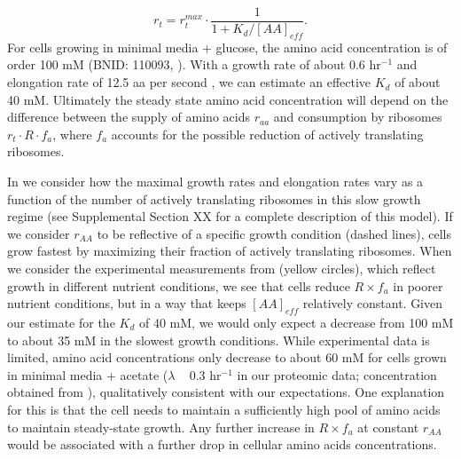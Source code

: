 \begin{equation}
r_t = r_t^{max} \cdot \frac{1}{1 + K_d / [AA]_{eff}}.
\label{eq:rate_Kd}
\end{equation}
For cells growing in minimal media + glucose, the amino acid concentration is of
order 100 mM  (BNID: 110093, \citep{milo2010, bennett2009}). With a growth rate
of about 0.6 hr$^{-1}$ and elongation rate of 12.5 aa per second
\citep{dai2016}, we can estimate an effective $K_d$ of about 40 mM. Ultimately
the steady state amino acid concentration will depend on the difference between
the supply of amino acids $r_{aa}$ and consumption by ribosomes $r_t \cdot R
\cdot f_a$, where $f_a$ accounts for the possible reduction of actively
translating ribosomes.

In  we consider how the maximal growth rates and
elongation rates vary as a function of the number of actively translating
ribosomes in this slow growth regime (see Supplemental Section XX for a complete
description of this model). If we consider $r_{AA}$ to be reflective of a
specific growth condition (dashed lines), cells grow fastest by maximizing their
fraction of actively translating ribosomes. When we consider the experimental
measurements from \cite{dai2018} (yellow circles), which reflect growth in
different nutrient conditions, we see that cells reduce $R \times f_a$ in poorer
nutrient conditions, but in a way that keeps $[AA]_{eff}$ relatively constant.
Given our estimate for the $K_d$ of 40 mM,  we would only expect a decrease from
100 mM to about 35 mM in the slowest growth conditions. While experimental data
is limited, amino acid concentrations only decrease to about 60 mM for cells
grown in minimal media + acetate ($\lambda$ ~ 0.3 hr$^{-1}$ in our proteomic
data; concentration obtained from \cite{bennett2009}), qualitatively consistent
with our expectations.  One explanation for this is that the cell needs to
maintain a sufficiently  high pool of amino acids to maintain steady-state
growth. Any further increase in $R \times f_a$ at constant $r_{AA}$ would be
associated with a further drop in cellular amino acids concentrations.


